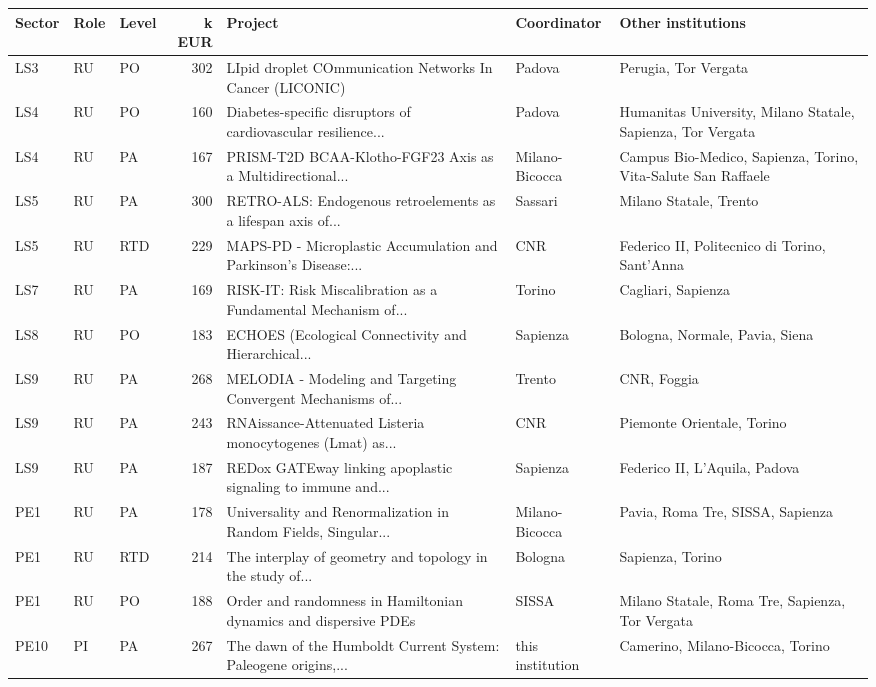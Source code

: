 \documentclass[11pt,a4paper]{article}
\begin{document}
{\footnotesize
\begin{longtable}{lllrp{4.2cm}p{2cm}p{3.2cm}}
\toprule
Sector & Role & Level & k EUR & Project & Coordinator & Other institutions \\
\midrule
\endhead
LS3 & RU & PO & 302 & LIpid droplet COmmunication Networks In Cancer (LICONIC) & Padova & Perugia, Tor Vergata \\
LS4 & RU & PO & 160 & Diabetes-specific disruptors of cardiovascular resilience... & Padova & Humanitas University, Milano Statale, Sapienza, Tor Vergata \\
LS4 & RU & PA & 167 & PRISM-T2D BCAA-Klotho-FGF23 Axis as a Multidirectional... & Milano-Bicocca & Campus Bio-Medico, Sapienza, Torino, Vita-Salute San Raffaele \\
LS5 & RU & PA & 300 & RETRO-ALS: Endogenous retroelements as a lifespan axis of... & Sassari & Milano Statale, Trento \\
LS5 & RU & RTD & 229 & MAPS-PD - Microplastic Accumulation and Parkinson's Disease:... & CNR & Federico II, Politecnico di Torino, Sant'Anna \\
LS7 & RU & PA & 169 & RISK-IT: Risk Miscalibration as a Fundamental Mechanism of... & Torino & Cagliari, Sapienza \\
LS8 & RU & PO & 183 & ECHOES (Ecological Connectivity and Hierarchical... & Sapienza & Bologna, Normale, Pavia, Siena \\
LS9 & RU & PA & 268 & MELODIA - Modeling and Targeting Convergent Mechanisms of... & Trento & CNR, Foggia \\
LS9 & RU & PA & 243 & RNAissance-Attenuated Listeria monocytogenes (Lmat) as... & CNR & Piemonte Orientale, Torino \\
LS9 & RU & PA & 187 & REDox GATEway linking apoplastic signaling to immune and... & Sapienza & Federico II, L'Aquila, Padova \\
PE1 & RU & PA & 178 & Universality and Renormalization in Random Fields, Singular... & Milano-Bicocca & Pavia, Roma Tre, SISSA, Sapienza \\
PE1 & RU & RTD & 214 & The interplay of geometry and topology in the study of... & Bologna & Sapienza, Torino \\
PE1 & RU & PO & 188 & Order and randomness in Hamiltonian dynamics and dispersive PDEs & SISSA & Milano Statale, Roma Tre, Sapienza, Tor Vergata \\
PE10 & PI & PA & 267 & The dawn of the Humboldt Current System: Paleogene origins,... & this institution & Camerino, Milano-Bicocca, Torino \\

\end{longtable}}
\end{document}
